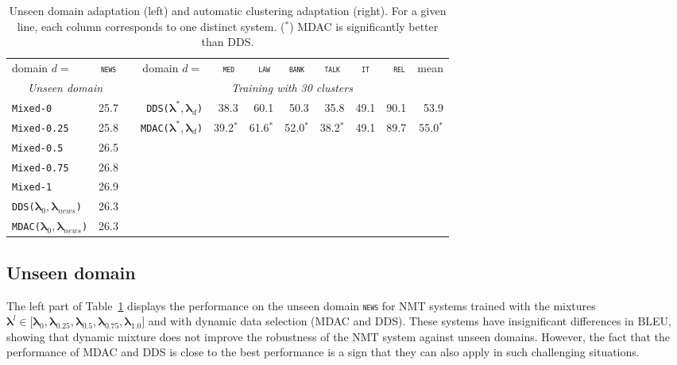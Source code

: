 \documentclass[11pt]{article}
\newcommand{\domain}[1]{\texttt{\textsc{#1}}}
\newcommand{\system}[1]{\texttt{{#1}}}
\newcommand{\vlambda}{\ensuremath{\boldsymbol\lambda}\xspace} %
\begin{document}
\begin{table}[htbp]
  \centering \small
  \begin{tabular}{|l|*{10}{r|}} \cline{1-2} \cline{4-11}
    domain \hfill $d=$ & \multicolumn{1}{c|}{\domain{news}}& \hfill &domain \hfill $d=$ & \multicolumn{1}{c|}{\domain{ med}} & \multicolumn{1}{c|}{\domain{ law}} & \multicolumn{1}{c|}{\domain{bank}} & \multicolumn{1}{c|}{\domain{talk}} & \multicolumn{1}{c|}{\domain{ it }} & \multicolumn{1}{c|}{\domain{ rel}} & \multicolumn{1}{c|}{mean}  \\ 
\cline{1-2} \cline{4-11}
    \multicolumn{2}{|c|}{\sl Unseen domain} & &\multicolumn{8}{c|}{\sl Training with 30 clusters} \\ 
\cline{1-2} \cline{4-11}
    \system{Mixed-0}      & 25.7 & &\system{DDS($\vlambda^*, \vlambda_d$)}&38.3&60.1&50.3&35.8&49.1&90.1&53.9\\
    \system{Mixed-0.25} & 25.8 & &\system{MDAC($\vlambda^*, \vlambda_d$)}&39.2$^*$&61.6$^*$&52.0$^*$&38.2$^*$&49.1&89.7&55.0$^*$\\ \cline{4-11}
    \system{Mixed-0.5}   &26.5\\
    \system{Mixed-0.75} &26.8\\
    \system{Mixed-1} &26.9 \\
    \cline{1-2}
     \system{DDS($\vlambda_0, \vlambda_{news}$)} &26.3 \\
     \system{MDAC($\vlambda_0, \vlambda_{news}$)} &26.3 \\
     \cline{1-2}
  \end{tabular}
  \caption{Unseen domain adaptation (left) and automatic clustering adaptation (right). For a given line, each column corresponds to one distinct system. ($^*$) MDAC is significantly better than DDS.}
  \label{tab:unsupervised-da}
\end{table}

\subsection{Unseen domain}\label{ssec:uda}
The left part of Table~\ref{tab:unsupervised-da} displays the performance on the unseen domain \domain{news} for NMT systems trained with the mixtures $\vlambda^l \in \big[ \vlambda_0, \vlambda_{0.25}, \vlambda_{0.5}, \vlambda_{0.75}, \vlambda_{1.0}\big]$ and with dynamic data selection (MDAC and DDS). These systems have insignificant differences in BLEU, showing that dynamic mixture does not improve the robustness of the NMT system against unseen domains. However, the fact that the performance of MDAC and DDS is close to the best performance is a sign that they can also apply in such challenging situations. %
\end{document}
